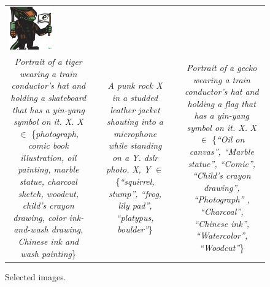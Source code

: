\begin{figure}[ht!]
\begin{adjustwidth}{-0.8in}{-0.5in}
\begin{tabular}{cccccccccccccccccccc}
\multicolumn{2}{c}{\includegraphics[width=\threebythreecolwidth\textwidth]{figures/cherries/woodcut.jpg}} \\

\multicolumn{6}{p{\thirdcolwidth\textwidth}}{{\tiny \textit{Portrait of a tiger wearing a train conductor's hat and holding a skateboard that has a yin-yang symbol on it. X.} \textit{X} $\in$ \{\textit{photograph, comic book illustration, oil painting, marble statue, charcoal sketch, woodcut, child's crayon drawing, color ink-and-wash drawing, Chinese ink and wash painting}\}}} &&
\multicolumn{6}{p{\thirdcolwidth\textwidth}}{{\tiny \textit{A punk rock X in a studded leather jacket shouting into a microphone while standing on a Y. dslr photo.} \textit{X, Y} $\in$ \{\textit{``squirrel, stump'', ``frog, lily pad'', ``platypus, boulder''}\}}} &&
\multicolumn{6}{p{\thirdcolwidth\textwidth}}{{\tiny \textit{Portrait of a gecko wearing a train conductor's hat and holding a flag that has a yin-yang symbol on it. X.} \textit{X} $\in$ \{\textit{``Oil on canvas'', ``Marble statue'', ``Comic'', ``Child's crayon drawing'', ``Photograph'' ,  ``Charcoal'', ``Chinese ink'', ``Watercolor'', ``Woodcut''}\}}} \\
\end{tabular}
\end{adjustwidth}
\caption{Selected \bdraw images.}
\label{figs:appendix_cherry1}
\end{figure}
